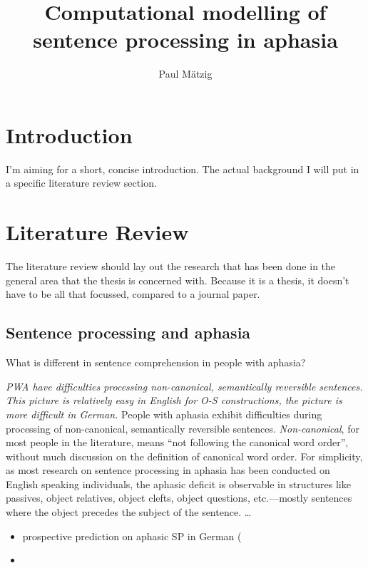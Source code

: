 \documentclass{scrartcl}
\title{Computational modelling of sentence processing in aphasia}
\author{Paul M\"{a}tzig}
\begin{document}
\maketitle


\section{Introduction}

I'm aiming for a short, concise introduction. The actual background I will put in a
specific literature review section.

\section{Literature Review}

The literature review should lay out the research that has been done in the general area
that the thesis is concerned with. Because it is a thesis, it doesn't have to be all that
focussed, compared to a journal paper. 

\subsection{Sentence processing and aphasia}

What is different in sentence comprehension in people with aphasia?

\emph{PWA have difficulties processing non-canonical, semantically reversible sentences. This picture is relatively easy in English for O-S constructions, the picture is more difficult in German.}
People with aphasia exhibit difficulties during processing of non-canonical, semantically reversible sentences. \emph{Non-canonical}, for most people in the literature, means ``not following the canonical word order'', without much discussion on the definition of canonical word order. For simplicity, as most research on sentence processing in aphasia has been conducted on English speaking individuals, the aphasic deficit is observable in structures like passives, object relatives, object clefts, object questions, etc.---mostly sentences where the object precedes the subject of the sentence. \ldots 
\begin{itemize}
  \item prospective prediction on aphasic SP in German (
  \item 
\end{itemize}
\end{document}
